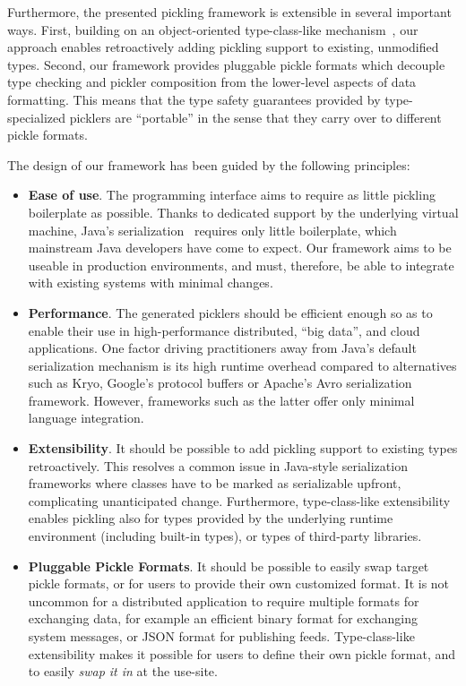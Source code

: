 \documentclass[preprint,10pt]{sigplanconf}
\theoremstyle{definition}
\theoremstyle{definition}
\begin{document}
Furthermore, the presented pickling framework is extensible in several
important ways. First, building on an object-oriented type-class-like
mechanism~\cite{Oliveira2010}, our approach enables retroactively adding
pickling support to existing, unmodified types. Second, our framework provides
pluggable pickle formats which decouple type checking and pickler composition
from the lower-level aspects of data formatting. This means that the type
safety guarantees provided by type-specialized picklers are ``portable'' in
the sense that they carry over to different pickle formats.

The design of our framework has been guided by the following principles:
\begin{itemize}
\item {\bf Ease of use}. The programming interface aims to require as little
pickling boilerplate as possible. Thanks to dedicated support by the
underlying virtual machine, Java's serialization~\cite{JavaSerialization}
requires only little boilerplate, which mainstream Java developers have come
to expect. Our framework aims to be useable in production environments, and
must, therefore, be able to integrate with existing systems with minimal
changes.

\item {\bf Performance}. The generated picklers should be efficient enough  so
as to enable their use in high-performance distributed, ``big data'', and
cloud applications. One factor driving practitioners away from Java's default
serialization mechanism is its high runtime overhead compared to alternatives
such as Kryo, Google's protocol buffers or Apache's Avro serialization
framework. However, frameworks such as the latter offer only minimal language
integration.

\item {\bf Extensibility}. It should be possible to add pickling support to existing
types retroactively. This resolves a common issue in Java-style serialization
frameworks where classes have to be marked as serializable upfront,
complicating unanticipated change. Furthermore, type-class-like extensibility
enables pickling also for types provided by the underlying runtime environment
(including built-in types), or types of third-party libraries.

\item {\bf Pluggable Pickle Formats}. It should be possible to easily swap target
pickle formats, or for users to provide their own customized format. It is not
uncommon for a distributed application to require multiple formats for
exchanging data, for example an efficient binary format for exchanging system
messages, or JSON format for publishing feeds. Type-class-like extensibility
makes it possible for users to define their own pickle format, and to easily
{\em swap it in} at the use-site.


\end{itemize}
\end{document}
